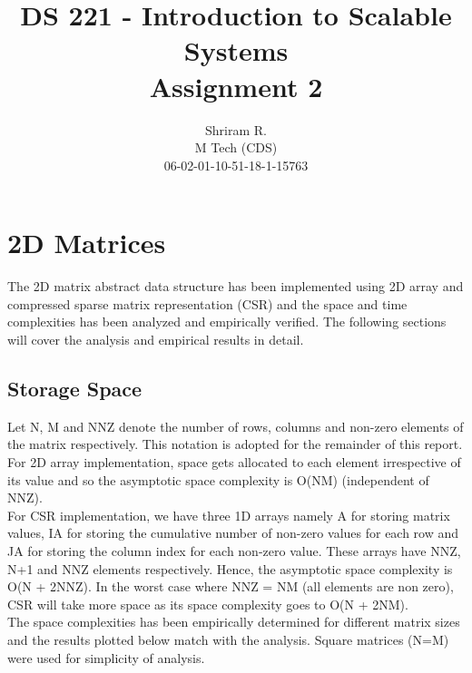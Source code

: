 \documentclass[11pt,a4paper,oneside]{article}
\begin{document}
	\title{DS 221 - Introduction to Scalable Systems \\ Assignment 2}
	\author{Shriram R. \\ M Tech (CDS) \\ 06-02-01-10-51-18-1-15763}
	\maketitle
	
	\section{2D Matrices}
	The 2D matrix abstract data structure has been implemented using 2D array and compressed sparse matrix representation (CSR) and the space and time complexities has been analyzed and empirically verified.
	The following sections will cover the analysis and empirical results in detail.
	
	\subsection{Storage Space}
	Let N, M and NNZ denote the number of rows, columns and non-zero elements of the matrix respectively. This notation is adopted for the remainder of this report. For 2D array implementation, space gets allocated to each element irrespective of its value and so the asymptotic space complexity is O(NM) (independent of NNZ). \\
	\newline
	For CSR implementation, we have three 1D arrays namely A for storing matrix values, IA for storing the cumulative number of non-zero values for each row and JA for storing the column index for each non-zero value. These arrays have NNZ, N+1 and NNZ elements respectively. Hence, the asymptotic space complexity is O(N + 2NNZ). In the worst case where NNZ = NM (all elements are non zero), CSR will take more space as its space complexity goes to O(N + 2NM). \\
	\newline
	The space complexities has been empirically determined for different matrix sizes and the results plotted below match with the analysis. Square matrices (N=M) were used for simplicity of analysis.
	
\end{document}
